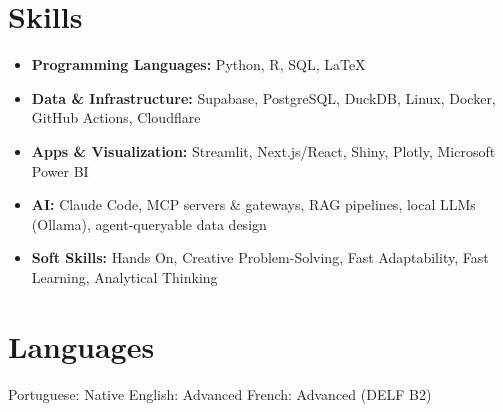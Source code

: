 \documentclass[10pt]{article}
\begin{document}
\section*{Skills}
\begin{itemize}
\item \textbf{Programming Languages:} Python, R, SQL, LaTeX
\item \textbf{Data \& Infrastructure:} Supabase, PostgreSQL, DuckDB, Linux, Docker, GitHub Actions, Cloudflare
\item \textbf{Apps \& Visualization:} Streamlit, Next.js/React, Shiny, Plotly, Microsoft Power BI
\item \textbf{AI:} Claude Code, MCP servers \& gateways, RAG pipelines, local LLMs (Ollama), agent-queryable data design
\item \textbf{Soft Skills:} Hands On, Creative Problem-Solving, Fast Adaptability, Fast Learning, Analytical Thinking
\end{itemize}

\section*{Languages}
Portuguese: Native \quad English: Advanced \quad French: Advanced (DELF B2)
\end{document}
